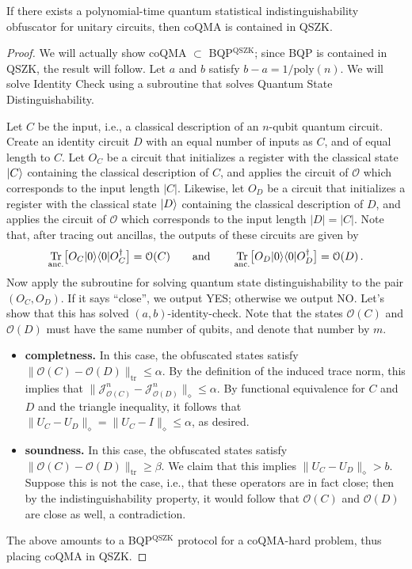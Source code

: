\documentclass[envcountsame]{llncs}
\DeclareMathOperator{\tr}{Tr}
\numberwithin{equation}{section}
\begin{document}
\begin{theorem}
If there exists a polynomial-time quantum statistical indistinguishability obfuscator for unitary circuits, then coQMA is contained in QSZK.
\end{theorem}
\begin{proof}
We will actually show coQMA $\subset$ BQP$^{\text{QSZK}}$; since BQP is contained in QSZK, the result will follow. Let $a$ and $b$ satisfy $b-a = 1 / \text{poly}(n)$. We will solve Identity Check using a subroutine that solves Quantum State Distinguishability. 

Let $C$ be the input, i.e., a classical description of an $n$-qubit quantum circuit. Create an identity circuit $D$ with an equal number of inputs as $C$, and of equal length to $C$. Let $O_C$ be a circuit that initializes a register with the classical state ${\left\vert{C}\right\rangle}$ containing the classical description of $C$, and applies the circuit of $\mathcal O$ which corresponds to the input length $|C|$. Likewise, let $O_D$ be a circuit that initializes a register with the classical state ${\left\vert{D}\right\rangle}$ containing the classical description of $D$, and applies the circuit of $\mathcal O$ which corresponds to the input length $|D| = |C|$. Note that, after tracing out ancillas, the outputs of these circuits are given by
$$
\tr_\text{anc.} \bigl[O_C\ket{0}\bra{0}O_C^\dagger\bigr] = \mathcal O(C)
\qquad \text{and} \qquad
\tr_\text{anc.} \bigl[O_D\ket{0}\bra{0}O_D^\dagger\bigr] = \mathcal O(D)\,.
$$
Now apply the subroutine for solving quantum state distinguishability to the pair $(O_C, O_D)$. If it says ``close'', we output YES; otherwise we output NO. Let's show that this has solved $(a, b)$-identity-check. Note that the states $\mathcal O(C)$ and $\mathcal O(D)$ must have the same number of qubits, and denote that number by $m$.
\begin{itemize}
\item \textbf{completness.} In this case, the obfuscated states satisfy $\|\mathcal O(C) - \mathcal O(D)\|_\text{tr} \leq \alpha$.  By the definition of the induced trace norm, this implies that $\|\mathcal J_{\mathcal O(C)}^n - \mathcal J_{\mathcal O(D)}^n\|_\diamond \leq \alpha$. By functional equivalence for $C$ and $D$ and the triangle inequality, it follows that $\|U_C - U_D\|_\diamond = \|U_C - I\|_\diamond \leq \alpha$, as desired.

\item \textbf{soundness.} In this case, the obfuscated states satisfy $\|\mathcal O(C) - \mathcal O(D)\|_\text{tr} \geq \beta$. We claim that this implies $\|U_C - U_D\|_\diamond > b$. Suppose this is not the case, i.e., that these operators are in fact close; then by the indistinguishability property, it would follow that $\mathcal O(C)$ and $\mathcal O(D)$ are close as well, a contradiction.
\end{itemize}
The above amounts to a BQP$^\text{QSZK}$ protocol for a coQMA-hard problem, thus placing coQMA in QSZK.
\end{proof}
\end{document}
